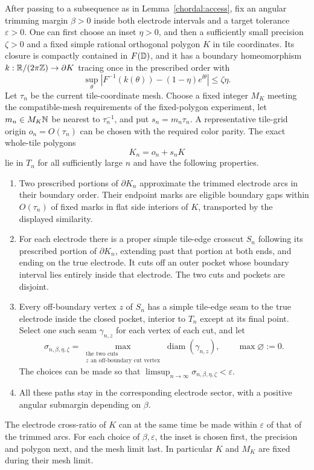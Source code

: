 \begin{lemma}\label{chordal:seams}
After passing to a subsequence as in Lemma~\ref{chordal:access}, fix
an angular trimming margin $\beta>0$ inside both electrode intervals
and a target tolerance $\varepsilon>0$.  One can first choose an inset
$\eta>0$, and then a sufficiently small precision $\zeta>0$ and a
fixed simple rational orthogonal polygon $K$ in tile coordinates.
Its closure is compactly contained in $F(\mathbb D)$, and it has a boundary
homeomorphism $k:\mathbb R/(2\pi\mathbb Z)\to\partial K$ tracing once in the prescribed
order with
\[
 \sup_\theta\left|F^{-1}(k(\theta))-(1-\eta)e^{\ii\theta}\right|
 \le \zeta\eta.
\]
Let $\tau_n$ be the current tile-coordinate mesh.  Choose a fixed
integer $M_K$ meeting the compatible-mesh requirements of the
fixed-polygon experiment, let $m_n\in M_K\mathbb N$ be nearest to
$\tau_n^{-1}$, and put $s_n=m_n\tau_n$.  A representative tile-grid
origin $o_n=O(\tau_n)$ can be chosen with the required color parity.
The exact whole-tile polygons
\[
 K_n=o_n+s_nK
\]
lie in $T_n$ for all sufficiently large $n$ and have the following
properties.
\begin{enumerate}[label=(\roman*)]
\item Two prescribed portions of $\partial K_n$ approximate the
trimmed electrode arcs in their boundary order.  Their endpoint marks
are eligible boundary gaps within $O(\tau_n)$ of fixed marks in flat
side interiors of $K$, transported by the displayed similarity.
\item For each electrode there is a proper simple tile-edge crosscut
$S_n$ following its prescribed portion of $\partial K_n$, extending
past that portion at both ends, and ending on the true electrode.
It cuts off an outer pocket whose boundary interval lies entirely
inside that electrode.  The two cuts and pockets are disjoint.
\item Every off-boundary vertex $z$ of $S_n$ has a simple tile-edge
seam to the true electrode inside the closed pocket, interior to
$T_n$ except at its final point.  Select one such seam $\gamma_{n,z}$
for each vertex of each cut, and let
\[
 \sigma_{n,\beta,\eta,\zeta}
 =\max_{\substack{\text{the two cuts}\\
                   z\text{ an off-boundary cut vertex}}}
       \operatorname{diam}(\gamma_{n,z}),
 \qquad \max\varnothing:=0.
\]
The choices can be made so that
$\limsup_{n\to\infty}\sigma_{n,\beta,\eta,\zeta}<\varepsilon$.
\item All these paths stay in the corresponding electrode sector,
with a positive angular submargin depending on $\beta$.
\end{enumerate}
The electrode cross-ratio of $K$ can at the same time be made within
$\varepsilon$ of that of the trimmed arcs.  For each choice of
$\beta,\varepsilon$, the inset is chosen first, the precision and
polygon next, and the mesh limit last.  In particular $K$ and $M_K$
are fixed during their mesh limit.
\end{lemma}

